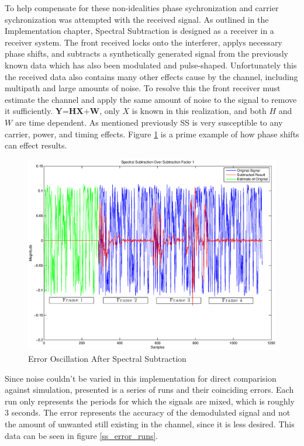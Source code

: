 To help compensate for these non-idealities phase sychronization and carrier sychronization was attempted with the received signal.  As outlined in the Implementation chapter, Spectral Subtraction is designed as a receiver in a receiver system.  The front received locks onto the interferer, applys necessary phase shifts, and subtracts a synthetically generated signal from the previously known data which has also been modulated and pulse-shaped.  Unfortunately this the received data also contains many other effects cause by the channel, including multipath and large amounts of noise.  To resolve this the front receiver must estimate the channel and apply the same amount of noise to the signal to remove it sufficiently.  \(\textbf{Y=HX+W}\), only \(X\) is known in this realization, and both \(H\) and \(W\) are time dependent.  As mentioned previously SS is very susceptible to any carrier, power, and timing effects.  Figure \ref{ss_oscillation} is a prime example of how phase shifts can effect results.\\

\begin{figure}\label{ss_oscillation}
\includegraphics{ss_oscillation.eps}
\caption{Error Oscillation After Spectral Subtraction}
\end{figure}

Since noise couldn't be varied in this implementation for direct comparision against simulation, presented is a series of runs and their coinciding errors.  Each run only represents the periods for which the signals are mixed, which is roughly 3 seconds.  The error represents the accuracy of the demodulated signal and not the amount of unwanted still existing in the channel, since it is less desired.  This data can be seen in figure \ref{ss_error_runs}.\\

